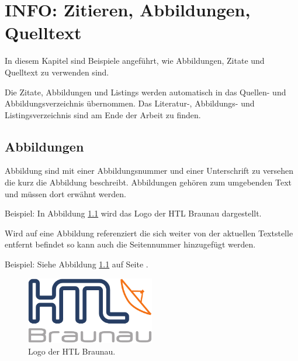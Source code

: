 


\chapter{INFO: Zitieren, Abbildungen, Quelltext\authorA}\label{ref:zitieren}

In diesem Kapitel sind Beispiele angeführt, wie Abbildungen, Zitate und Quelltext zu verwenden sind.

Die Zitate, Abbildungen und Listings werden automatisch in das Quellen- und Abbildungsverzeichnis übernommen. 
Das Literatur-, Abbildungs- und Listingsverzeichnis sind am Ende der Arbeit zu finden.   

\section{Abbildungen}\label{ref:abbildungen}

Abbildung sind mit einer Abbildungsnummer und einer Unterschrift zu versehen die kurz die Abbildung beschreibt. 
Abbildungen gehören zum umgebenden Text und müssen dort erwähnt werden.

Beispiel: In Abbildung \ref{htl01} wird das Logo der HTL Braunau dargestellt.

Wird auf eine Abbildung referenziert die sich weiter von der aktuellen Textstelle entfernt befindet so kann auch die Seitennummer hinzugefügt werden.

Beispiel: Siehe Abbildung \ref{htl01} auf Seite \pageref{htl01}.


\begin{figure}[H]
	\centering
	\includegraphics[width=0.5\textwidth]{./media/images/htl_c_cmyk_rein.pdf}
  	\caption{Logo der HTL Braunau.}
  	\label{htl01}
\end{figure}



